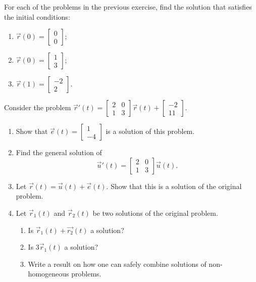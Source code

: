 \begin{exercises}
\begin{problist}
	\prob For each of the problems in the previous exercise, find the solution that satisfies the initial conditions:
	\begin{enumerate}[label=(\roman*)]
		\item $\vec{r}(0)=\begin{bmatrix} 0 \\ 0 \end{bmatrix}$;
		\item $\vec{r}(0)=\begin{bmatrix} 1 \\ 3 \end{bmatrix}$;
		\item $\vec{r}(1)=\begin{bmatrix} -2 \\ 2 \end{bmatrix}$.
	\end{enumerate}


	\prob Consider the problem $\vec{r}'(t) = \begin{bmatrix} 2 & 0 \\ 1 & 3 \end{bmatrix} \vec{r}(t) + \begin{bmatrix} -2 \\ 11 \end{bmatrix}$.
	\begin{enumerate}
		\item Show that $\vec{e}(t) = \begin{bmatrix} 1 \\ -4 	\end{bmatrix}$ is a solution of this problem.
		\item Find the general solution of 
		$$\vec{u}'(t) = \begin{bmatrix} 2 & 0 \\ 1 & 3 \end{bmatrix} \vec{u}(t).$$
		\item Let $\vec{r}(t) = \vec{u}(t) + \vec{e}(t)$. Show that this is a solution of the original problem.
		\item Let $\vec{r}_1(t)$ and $\vec{r}_2(t)$ be two solutions of the original problem. 
		\begin{enumerate}
			\item Is $\vec{r}_1(t) + \vec{r_2}(t)$ a solution? 
			\item Is $3\vec{r}_1(t) $ a solution? 
			\item Write a result on how one can safely combine solutions of non-homogeneous problems.
		\end{enumerate}
	\end{enumerate}


\end{problist}
\end{exercises}
